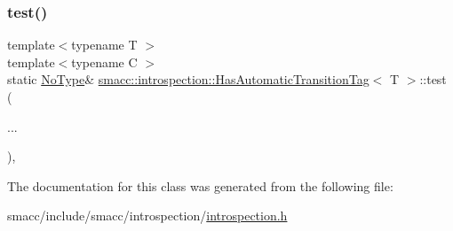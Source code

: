 \mbox{\label{classsmacc_1_1introspection_1_1HasAutomaticTransitionTag_aa38a947c16db7a23eefa754ba2c90782}} 
\subsubsection{\texorpdfstring{test()}{test()}\hspace{0.1cm}{\footnotesize\ttfamily [2/2]}}
{\footnotesize\ttfamily template$<$typename T $>$ \\
template$<$typename C $>$ \\
static \hyperlink{classsmacc_1_1introspection_1_1HasAutomaticTransitionTag_ab81e7f76862ba064df3fd8e78b3864c4}{No\+Type}\& \hyperlink{classsmacc_1_1introspection_1_1HasAutomaticTransitionTag}{smacc\+::introspection\+::\+Has\+Automatic\+Transition\+Tag}$<$ T $>$\+::test (\begin{DoxyParamCaption}\item[{}]{... }\end{DoxyParamCaption})\hspace{0.3cm}{\ttfamily [static]}, {\ttfamily [private]}}



The documentation for this class was generated from the following file\+:\begin{DoxyCompactItemize}
\item 
smacc/include/smacc/introspection/\hyperlink{introspection_8h}{introspection.\+h}\end{DoxyCompactItemize}
